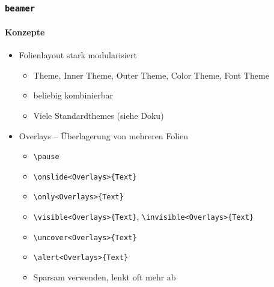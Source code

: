 \begin{frame}
  \frametitle{\texttt{beamer}}
  \framesubtitle{Code-Beispiel}
  TeX}]{examples/presentations/minimal-beamer.tex}
\end{frame}

\begin{frame}
  \frametitle{\texttt{beamer}}
  \framesubtitle{Konzepte}
  \begin{itemize}
  \item Folienlayout stark modularisiert
    \begin{itemize}
    \item Theme, Inner Theme, Outer Theme, Color Theme, Font Theme
    \item beliebig kombinierbar
    \item Viele Standardthemes (siehe Doku)
    \end{itemize}
  \item Overlays – Überlagerung von mehreren Folien
    \begin{itemize}
    \item \texttt{\textbackslash pause}
    \item \texttt{\textbackslash onslide<Overlays>\{Text\}}
    \item \texttt{\textbackslash only<Overlays>\{Text\}}
    \item \texttt{\textbackslash visible<Overlays>\{Text\}},
      \texttt{\textbackslash invisible<Overlays>\{Text\}}
    \item \texttt{\textbackslash uncover<Overlays>\{Text\}}
    \item \texttt{\textbackslash alert<Overlays>\{Text\}}
    \item Sparsam verwenden, lenkt oft mehr ab
    \end{itemize}
  \end{itemize}
\end{frame}

